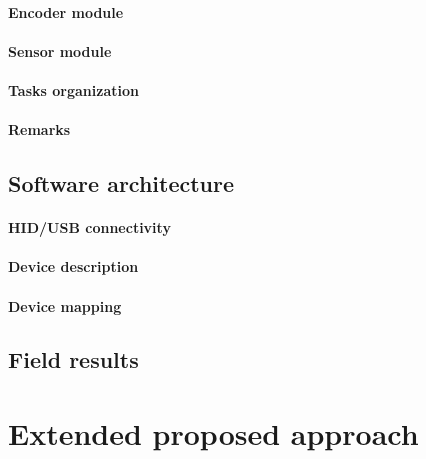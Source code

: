 \documentclass[a4paper,10pt]{article}
\begin{document}
\begin{multicols}{2}
\paragraph{Encoder module}
\TODO


\paragraph{Sensor module}
\TODO


\paragraph{Tasks organization}
\TODO


\paragraph{Remarks}
\TODO


\subsection{Software architecture}

\TODO


\paragraph{HID/USB connectivity}
\TODO


\paragraph{Device description}
\TODO


\paragraph{Device mapping}
\TODO


\subsection{Field results}

\TODO


\section{Extended proposed approach}


\end{multicols}
\end{document}
